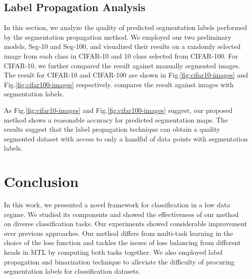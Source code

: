 \documentclass[conference]{IEEEtran}
\begin{document}
\subsection{Label Propagation Analysis}
In this section, we analyze the quality of predicted segmentation labels performed by the segmentation propagation method. We employed our two preliminary models, Seg-10 and Seg-100, and visualized their results on a randomly selected image from each class in CIFAR-10 and 10 class selected from CIFAR-100. For CIFAR-10, we further compared the result against manually segmented images. The result for CIFAR-10 and CIFAR-100 are shown in Fig.\ref{fig:cifar10-images} and Fig.\ref{fig:cifar100-images} respectively. compares the result against images with segmentation labels. 

As Fig.\ref{fig:cifar10-images} and Fig.\ref{fig:cifar100-images} suggest, our proposed method shows a reasonable accuracy for predicted segmentation maps. The results suggest that the label propagation technique can obtain a quality segmented dataset with access to only a handful of data points with segmentation labels.

\section{Conclusion}
In this work, we presented a novel framework for classification in a low data regime. We studied its components and showed the effectiveness of our method on diverse classification tasks. Our experiments showed considerable improvement over previous approaches. Our method differs from multi-task learning in the choice of the loss function and tackles the issues of loss balancing from different heads in MTL by computing both tasks together. We also employed label propagation and binarization technique to alleviate the difficulty of procuring segmentation labels for classification datasets. 



\end{document}
